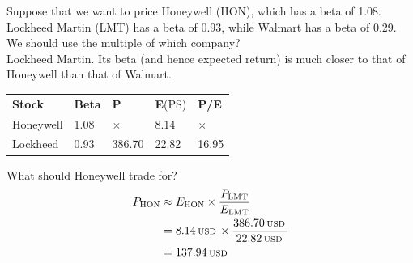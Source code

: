 \documentclass{beamer}
\newcommand{\USD}{\text{\scriptsize\:USD\:}}
\begin{document}
\begin{frame}{}
	Suppose that we want to price Honeywell (HON), which has a beta of 1.08. Lockheed Martin (LMT) has a beta of 0.93, while Walmart has a beta of 0.29. We should use the multiple of which company?\\
	\pause
	{\color{blue} Lockheed Martin. Its beta (and hence expected return) is much closer to that of Honeywell than that of Walmart.}
\end{frame}

\begin{frame}{}
\begin{center}
	\begin{tabular}{lllll}
		\textbf{Stock} & \textbf{Beta} & \textbf{P} & \textbf{E}(PS) & \textbf{P/E} \\ 
		Honeywell & 1.08 & $\times$ & 8.14\USD & $\times$ \\
		Lockheed & 0.93 & 386.70\USD & 22.82\USD & 16.95\USD \\
	\end{tabular}
\end{center}
	What should Honeywell trade for?\\
	\pause
	{\color{blue}
		\begin{align*}
			P_{\text{HON}}&\approx E_{\text{HON}}\times\frac{P_{\text{LMT}}}{E_{\text{LMT}}}\\
			&=8.14\USD\times\frac{386.70\USD}{22.82\USD}\\
			&=137.94\USD
		\end{align*}
	}
\end{frame}
\end{document}
